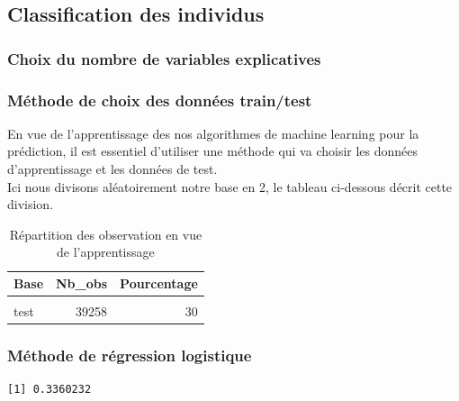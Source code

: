 \documentclass[french,]{tp}
\begin{document}
\newpage

\hypertarget{classification-des-individus}{%
\subsection{Classification des individus}\label{classification-des-individus}}

\hypertarget{choix-var}{%
\subsubsection{Choix du nombre de variables explicatives}\label{choix-var}}

\hypertarget{div-train-test}{%
\subsubsection{Méthode de choix des données train/test}\label{div-train-test}}

En vue de l'apprentissage des nos algorithmes de machine learning pour la prédiction, il est essentiel d'utiliser une méthode qui va choisir les données d'apprentissage et les données de test.\\
Ici nous divisons aléatoirement notre base en 2, le tableau ci-dessous décrit cette division.



\begin{table}[H]

\caption{\label{tab:tabletraintest}Répartition des observation en vue de l'apprentissage}
\centering
\begin{tabular}[t]{lrr}
\toprule
\textbf{Base} & \textbf{Nb\_obs} & \textbf{Pourcentage}\\
\midrule
\cellcolor{gray!6}{train} & \cellcolor{gray!6}{91599} & \cellcolor{gray!6}{70}\\
test & 39258 & 30\\
\bottomrule
\end{tabular}
\end{table}

\newpage

\hypertarget{reg-log}{%
\subsubsection{Méthode de régression logistique}\label{reg-log}}

\begin{verbatim}
[1] 0.3360232
\end{verbatim}
\end{document}
